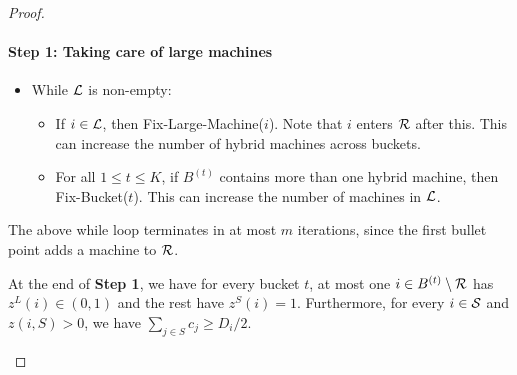 \documentclass{article}[11pt]
\newcommand{\brt}{{(t)}}
\begin{document}
\begin{proof}
   \paragraph{Step 1: Taking care of large machines}
   \begin{itemize}[noitemsep]
   	\item[] While ${\cal L}$ is non-empty: 
   	\begin{itemize}[noitemsep]
   		\item If $i\in {\cal L}$, then {\sf Fix-Large-Machine}($i$). Note that $i$ enters ${\cal R}$ after this. This can increase the number of hybrid machines across buckets.
   		\item For all $1\leq t\leq K$, if $B^\brt$ contains more than one hybrid machine, then {\sf Fix-Bucket}($t$). This can increase the number of machines in ${\cal L}$.
   	\end{itemize}
   \end{itemize}
   The above while loop terminates in at most $m$ iterations, since the first bullet point adds a machine to ${\cal R}$.
%   
   \begin{claim}\label{clm:003}
   	At the end of {\bf Step 1}, we have for every bucket $t$, at most one  $i\in B^\brt\setminus\calR$ has $z^L(i) \in (0,1)$ and the rest have $z^S(i) = 1$. Furthermore, for every $i\in {\cal S}$ and $z(i,S) > 0$, 
   	we have $\sum_{j\in S} c_j \geq D_i/2$.
   	\end{claim}
   	

   
   

\end{proof}
\end{document}
